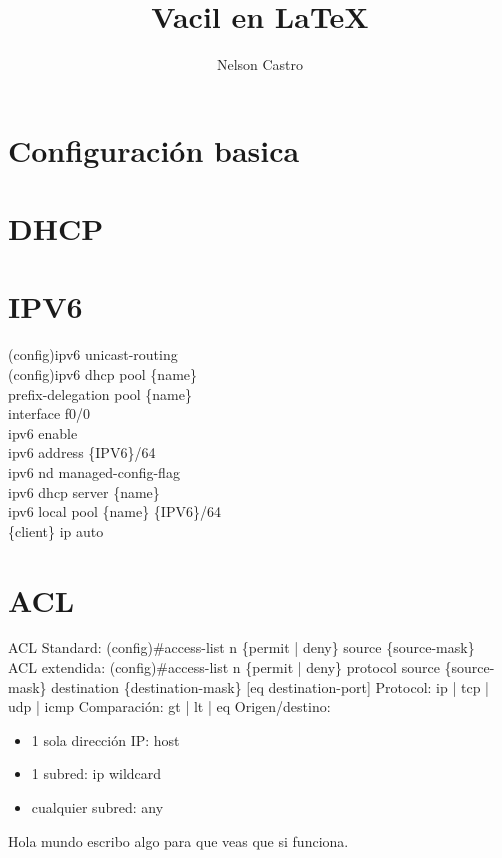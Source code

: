 \documentclass[12pt]{report}
\title{Vacil en \LaTeX}
\author{Nelson Castro}
\newcommand\tab[1][1cm]{\hspace*{#1}}
\begin{document}
        \maketitle
        \newpage
        \section*{Configuración basica}
        \section*{DHCP}
        \section*{IPV6}
            (config)ipv6 unicast-routing
            \\(config)ipv6 dhcp pool \{name\}
                \\ \tab prefix-delegation pool \{name\}
            \\interface f0/0
                \\ \tab ipv6 enable
                \\ \tab ipv6 address \{IPV6\}/64
                \\ \tab ipv6 nd managed-config-flag
                \\ \tab ipv6 dhcp server \{name\}
            \\ipv6 local pool \{name\} \{IPV6\}/64
            \\ \{client\} ip auto
        \section*{ACL}
        ACL Standard:
        \tab (config)\#access-list n \{permit | deny\} source \{source-mask\} 
        \\ACL extendida:
        \tab (config)\#access-list n \{permit | deny\} protocol source \{source-mask\} destination \{destination-mask\} [eq destination-port]
        Protocol: ip | tcp | udp | icmp
        Comparación: gt | lt | eq
        Origen/destino:
        \begin{itemize}
            \item 1 sola dirección IP: host
            \item 1 subred: ip wildcard
            \item cualquier subred: any
        \end{itemize}
        Hola mundo escribo algo para que veas que si funciona.
    
\end{document}
